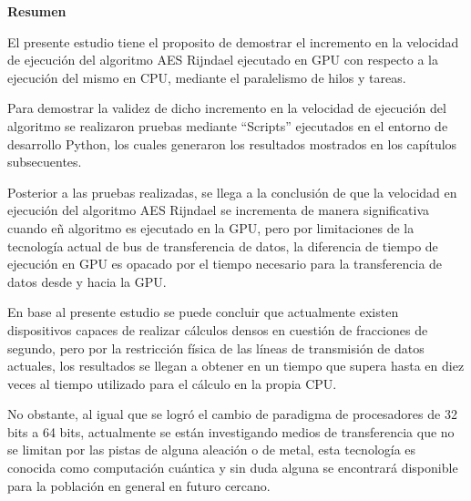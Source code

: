 \documentclass[../main/main.tex]{subfiles}
\begin{document}
  \begin{center}
    \textbf{\large Resumen}
  \end{center}

  El presente estudio tiene el proposito de demostrar el incremento en la velocidad de ejecución del algoritmo AES Rijndael ejecutado en GPU con respecto a la ejecución del mismo en CPU, mediante el paralelismo de hilos y tareas.

  Para demostrar la validez de dicho incremento en la velocidad de ejecución del algoritmo se realizaron pruebas mediante ``Scripts'' ejecutados en el entorno de desarrollo Python, los cuales generaron los resultados mostrados en los capítulos subsecuentes.

  Posterior a las pruebas realizadas, se llega a la conclusión de que la velocidad en ejecución del algoritmo AES Rijndael se incrementa de manera significativa cuando eñ algoritmo es ejecutado en la GPU, pero por limitaciones de la tecnología actual de bus de transferencia de datos, la diferencia de tiempo de ejecución en GPU es opacado por el tiempo necesario para la transferencia de datos desde y hacia la GPU.

  En base al presente estudio se puede concluir que actualmente existen dispositivos capaces de realizar cálculos densos en cuestión de fracciones de segundo, pero por la restricción física de las líneas de transmisión de datos actuales, los resultados se llegan a obtener en un tiempo que supera hasta en diez veces al tiempo utilizado para el cálculo en la propia CPU.

  No obstante, al igual que se logró el cambio de paradigma de procesadores de 32 bits a 64 bits, actualmente se están investigando medios de transferencia que no se limitan por las pistas de alguna aleación o de metal, esta tecnología es conocida como computación cuántica y sin duda alguna se encontrará disponible para la población en general en futuro cercano.
\end{document}

